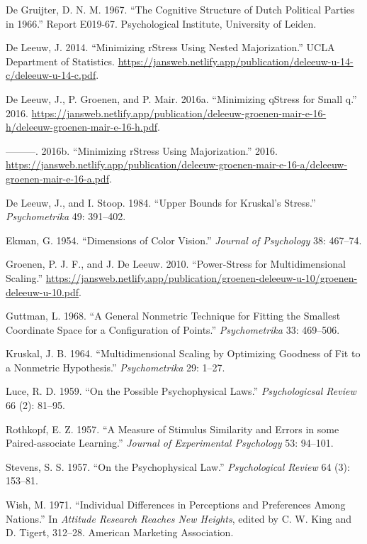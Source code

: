 \documentclass[
  12pt,
  letterpaper,
  DIV=11,
  numbers=noendperiod]{scrartcl}
\newlength{\cslhangindent}
\newenvironment{CSLReferences}[2] %
 {\begin{list}{}{%
  \setlength{\itemindent}{0pt}
  \setlength{\leftmargin}{0pt}
  \setlength{\parsep}{0pt}
  \ifodd #1
   \setlength{\leftmargin}{\cslhangindent}
   \setlength{\itemindent}{-1\cslhangindent}
  \fi
  \setlength{\itemsep}{#2\baselineskip}}}
 {\end{list}}
\begin{document}
\label{refs}
\begin{CSLReferences}{1}{0}
De Gruijter, D. N. M. 1967. {``{The Cognitive Structure of Dutch
Political Parties in 1966}.''} Report E019-67. Psychological Institute,
University of Leiden.

De Leeuw, J. 2014. {``{Minimizing rStress Using Nested Majorization}.''}
UCLA Department of Statistics.
\url{https://jansweb.netlify.app/publication/deleeuw-u-14-c/deleeuw-u-14-c.pdf}.

De Leeuw, J., P. Groenen, and P. Mair. 2016a. {``Minimizing qStress for
Small q.''} 2016.
\url{https://jansweb.netlify.app/publication/deleeuw-groenen-mair-e-16-h/deleeuw-groenen-mair-e-16-h.pdf}.

---------. 2016b. {``{Minimizing rStress Using Majorization}.''} 2016.
\url{https://jansweb.netlify.app/publication/deleeuw-groenen-mair-e-16-a/deleeuw-groenen-mair-e-16-a.pdf}.

De Leeuw, J., and I. Stoop. 1984. {``Upper Bounds for Kruskal's
Stress.''} \emph{Psychometrika} 49: 391--402.

Ekman, G. 1954. {``{Dimensions of Color Vision}.''} \emph{Journal of
Psychology} 38: 467--74.

Groenen, P. J. F., and J. De Leeuw. 2010. {``{Power-Stress for
Multidimensional Scaling}.''}
\url{https://jansweb.netlify.app/publication/groenen-deleeuw-u-10/groenen-deleeuw-u-10.pdf}.

Guttman, L. 1968. {``{A General Nonmetric Technique for Fitting the
Smallest Coordinate Space for a Configuration of Points}.''}
\emph{Psychometrika} 33: 469--506.

Kruskal, J. B. 1964. {``{Multidimensional Scaling by Optimizing Goodness
of Fit to a Nonmetric Hypothesis}.''} \emph{Psychometrika} 29: 1--27.

Luce, R. D. 1959. {``On the Possible Psychophysical Laws.''}
\emph{Psychologicsal Review} 66 (2): 81--95.

Rothkopf, E. Z. 1957. {``{A Measure of Stimulus Similarity and Errors in
some Paired-associate Learning}.''} \emph{Journal of Experimental
Psychology} 53: 94--101.

Stevens, S. S. 1957. {``On the Psychophysical Law.''}
\emph{Psychological Review} 64 (3): 153--81.

Wish, M. 1971. {``Individual Differences in Perceptions and Preferences
Among Nations.''} In \emph{Attitude Research Reaches New Heights},
edited by C. W. King and D. Tigert, 312--28. American Marketing
Association.

\end{CSLReferences}
\end{document}
